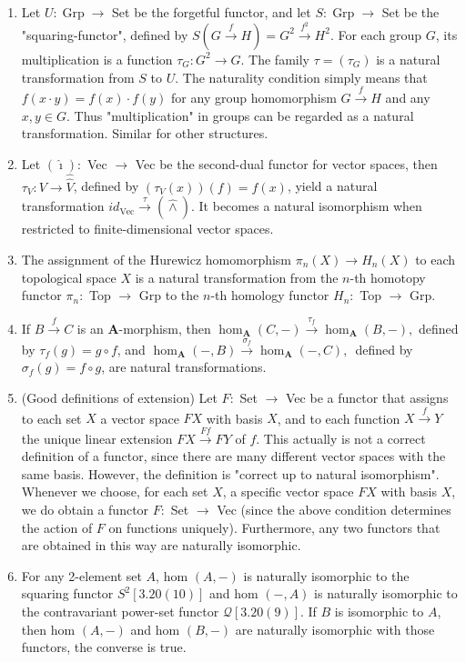 \begin{example}
    \begin{enumerate}
        \item Let $U: \operatorname{Grp} \rightarrow$ Set be the forgetful functor, and let $S: \operatorname{Grp} \rightarrow$ Set be the "squaring-functor", defined by $S(G \xrightarrow{f} H)=G^2 \xrightarrow{f^2} H^2$. For each group $G$, its multiplication is a function $\tau_G: G^2 \rightarrow G$. The family $\tau=\left(\tau_G\right)$ is a natural transformation from $S$ to $U$. The naturality condition simply means that $f(x \cdot y)=f(x) \cdot f(y)$ for any group homomorphism $G \xrightarrow{f} H$ and any $x, y \in G$. Thus "multiplication" in groups can be regarded as a natural transformation. Similar for other structures.
        \item Let $(\hat{\imath}):$ Vec $\rightarrow$ Vec be the second-dual functor for vector spaces, then $\tau_V: V \rightarrow \hat{\hat{V}}$, defined by $\left(\tau_V(x)\right)(f)=f(x)$, yield a natural transformation $i d{ }_{\mathrm{Vec}} \xrightarrow{\tau}(\hat{\wedge})$. It becomes a natural isomorphism when restricted to finite-dimensional vector spaces.
        \item The assignment of the Hurewicz homomorphism $\pi_n(X) \rightarrow H_n(X)$ to each topological space $X$ is a natural transformation from the $n$-th homotopy functor $\pi_n:$ Top $\rightarrow$ Grp to the $n$-th homology functor $H_n:$ Top $\rightarrow$ Grp.
        \item If $B \xrightarrow{f} C$ is an $\mathbf{A}$-morphism, then
        $
        \operatorname{hom}_{\mathbf{A}}(C,-) \xrightarrow{\tau_f} \operatorname{hom}_{\mathbf{A}}(B,-),
        $
        defined by $\tau_f(g)=g \circ f$, and
        $
        \operatorname{hom}_{\mathbf{A}}(-, B) \xrightarrow{\sigma_f} \operatorname{hom}_{\mathbf{A}}(-, C) \text {, }
        $
        defined by $\sigma_f(g)=f \circ g$, are natural transformations.
        \item (Good definitions of extension) Let $F:$ Set $\rightarrow$ Vec be a functor that assigns to each set $X$ a vector space $F X$ with basis $X$, and to each function $X \xrightarrow{f} Y$ the unique linear extension $F X \xrightarrow{F f} F Y$ of $f$. This actually is not a correct definition of a functor, since there are many different vector spaces with the same basis. However, the definition is "correct up to natural isomorphism". Whenever we choose, for each set $X$, a specific vector space $F X$ with basis $X$, we do obtain a functor $F:$ Set $\rightarrow$ Vec (since the above condition determines the action of $F$ on functions uniquely). Furthermore, any two functors that are obtained in this way are naturally isomorphic.
        \item For any 2-element set $A$, hom $(A,-)$ is naturally isomorphic to the squaring functor $S^2[3.20(10)]$ and hom $(-, A)$ is naturally isomorphic to the contravariant power-set functor $\mathcal{Q}[3.20(9)]$. If $B$ is isomorphic to $A$, then hom $(A,-)$ and hom $(B,-)$ are naturally isomorphic with those functors, the converse is true.
    \end{enumerate}
\end{example}

